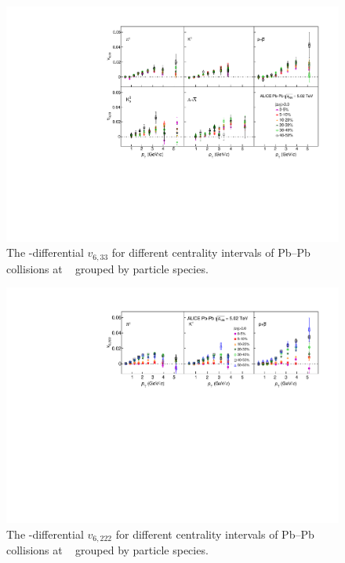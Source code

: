 \documentclass[ALICE,manyauthors]{cernphprep}
\begin{document}
\begin{figure}[!htb]
\begin{center}
\includegraphics[scale=0.82]{figures/results/All_v633_gap00_CentDep_PID2.pdf}
\end{center}
\caption{The \pT-differential $v_{6,33}$ for different centrality intervals of Pb--Pb collisions at \sNN~ grouped by particle species.}
\label{v633_centralityDependence}
\end{figure}

\begin{figure}[!htb]
\begin{center}
\includegraphics[scale=0.82]{figures/results/All_v6222_gap00_CentDep_PID2.pdf}
\end{center}
\caption{The \pT-differential $v_{6,222}$ for different centrality intervals of Pb--Pb collisions at \sNN~ grouped by particle species.}
\label{v6222_centralityDependence}
\end{figure}
\end{document}
